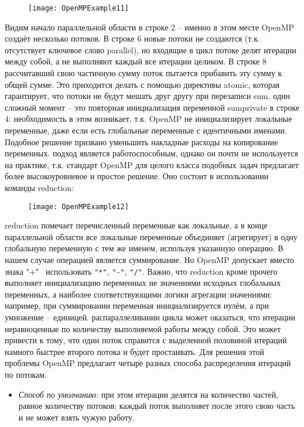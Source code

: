 {	\begin{figure}[H]
		\texttt{[image: OpenMPExample11]}
	\end{figure}
	Видим начало параллельной области в строке 2 – именно в этом месте OpenMP создаёт несколько потоков. В строке 6 новые потоки не создаются (т.к. отсутствует ключевое слово parallel), но входящие в цикл потоке делят итерации между собой, а не выполняют каждый все итерации целиком. В строке 8 рассчитавший свою частичную сумму поток пытается прибавить эту сумму к общей сумме. Это приходится делать с помощью директивы atomic, которая гарантирует, что потоки не будут мешать друг другу при перезаписи sum. 
	 один сложный момент – это повторная инициализация переменной sum\textunderscore private в строке 4: необходимость в этом возникает, т.к. OpenMP не инициализирует локальные переменные, даже если есть глобальные переменные с идентичными именами. Подобное решение призвано уменьшить накладные расходы на копирование переменных.
	 подход является работоспособным, однако он почти не используется на практике, т.к. стандарт OpenMP для целого класса подобных задач предлагает более высокоуровневое и простое решение. Оно состоит в использовании команды reduction:
	\begin{figure}[H]
		\texttt{[image: OpenMPExample12]}
	\end{figure}
	 reduction помечает перечисленный переменные как локальные, а в конце параллельной области все локальные переменные объединяет (агрегирует) в одну глобальную переменную с тем же именем, используя указанную операцию. В нашем случае операцией является суммирование. Но OpenMP допускает вместо знака "\verb+++"\verb+ + использовать \verb+"*"+, \verb+"-"+, \verb+"/"+. Важно, что reduction кроме прочего выполняет инициализацию переменных не значениями исходных глобальных переменных, а наиболее соответствующими логики агрегации значениями: например, при суммировании переменная инициализируется нулём, а при умножение – единицей.
	 распараллеливании цикла может оказаться, что итерации неравноценные по количеству выполняемой работы между собой. Это может привести к тому, что один поток справится с выделенной половиной итераций намного быстрее второго потока и будет простаивать. Для решения этой проблемы OpenMP предлагает четыре разных способа распределения итераций по потокам. 
	\begin{itemize}
		\item\textit{Способ по умолчанию:} при этом итерации делятся на количество частей, равное количеству потоков; каждый поток выполняет после этого свою часть и не может взять чужую работу.

\end{itemize}}
